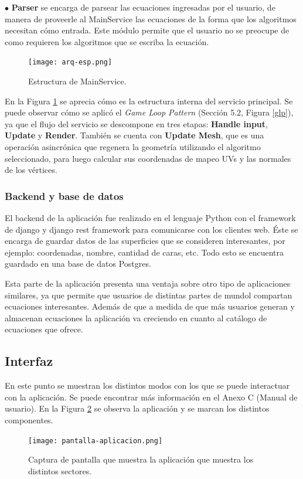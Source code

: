 \documentclass[12pt]{article}
\begin{document}
$\bullet$ \textbf{Parser} se encarga de parsear las ecuaciones ingresadas por el usuario, de manera de proveerle al MainService las ecuaciones de la forma que los algoritmos necesitan cómo entrada. Este módulo permite que el usuario no se preocupe de como requieren los algoritmos que se escriba la ecuación.
\begin{figure}[h!]
\texttt{[image: arq-esp.png]}
\caption{Estructura de MainService.}
\label{arqMS}
\end{figure}

En la Figura \ref{arqMS} se aprecia cómo es la estructura interna del servicio principal. Se puede observar cómo se aplicó el \textit{Game Loop Pattern} (Sección 5.2, Figura \ref{glp}), ya que el flujo del servicio se descompone en tres etapas: \textbf{Handle input}, \textbf{Update} y \textbf{Render}. También se cuenta con \textbf{Update Mesh}, que es una operación asincrónica que regenera la geometría utilizando el algoritmo seleccionado, para luego calcular sus coordenadas de mapeo UVs y las normales de los vértices.
\subsubsection{Backend y base de datos}
\noindent El backend de la aplicación fue realizado en el lenguaje Python con el framework de django y django rest framework para comunicarse con los clientes web. Éste se encarga de guardar datos de las superficies que se consideren interesantes, por ejemplo: coordenadas, nombre, cantidad de caras, etc. Todo esto se encuentra guardado en una base de datos Postgres.

Esta parte de la aplicación presenta una ventaja sobre otro tipo de aplicaciones similares, ya que permite que usuarios de distintas partes de mundol compartan ecuaciones interesantes. Además de que a medida de que más usuarios generan y almacenan ecuaciones la aplicación va creciendo en cuanto al catálogo de ecuaciones que ofrece.
\clearpage
\subsection{Interfaz}
\noindent En este punto se muestran los distintos modos con los que se puede interactuar con la aplicación. Se puede encontrar más información en el Anexo C (Manual de usuario). En la Figura \ref{pantalla} se observa la aplicación y se marcan los distintos componentes.

\begin{figure}[h]
\texttt{[image: pantalla-aplicacion.png]}
\caption{Captura de pantalla que muestra la aplicación que muestra los distintos sectores.}
\label{pantalla}
\end{figure}
\end{document}
